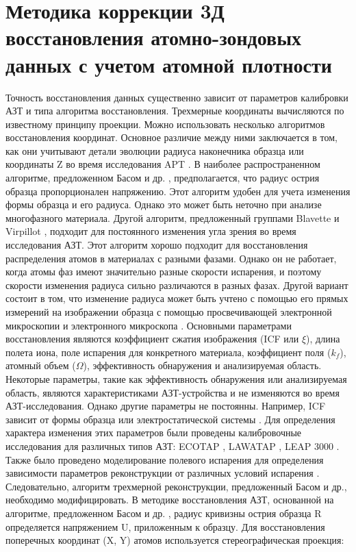 \FloatBarrier
\clearpage %
\section{Методика коррекции 3Д восстановления атомно-зондовых данных с учетом атомной плотности}\label{sec:ch3/sect5}

Точность восстановления данных существенно зависит от параметров калибровки АЗТ и типа алгоритма восстановления. Трехмерные координаты вычисляются по известному принципу проекции. Можно использовать несколько алгоритмов восстановления координат. Основное различие между ними заключается в том, как они учитывают детали эволюции радиуса наконечника образца или координаты Z во время исследования APT \cite{Vurpillot16}. В наиболее распространенном алгоритме, предложенном Басом и др. \cite{Bas95}, предполагается, что радиус острия образца пропорционален напряжению. Этот алгоритм удобен для учета изменения формы образца и его радиуса. Однако это может быть неточно при анализе многофазного материала. Другой алгоритм, предложенный группами Blavette и Virpillot \cite{Vurpillot11,Gault11}, подходит для постоянного изменения угла зрения во время исследования АЗТ. Этот алгоритм хорошо подходит для восстановления распределения атомов в материалах с разными фазами. Однако он не работает, когда атомы фаз имеют значительно разные скорости испарения, и поэтому скорости изменения радиуса сильно различаются в разных фазах. Другой вариант состоит в том, что изменение радиуса может быть учтено с помощью его прямых измерений на изображении образца с помощью просвечивающей электронной микроскопии и электронного микроскопа \cite{Larson11}. Основными параметрами восстановления являются коэффициент сжатия изображения (ICF или $\xi$), длина полета иона, поле испарения для конкретного материала, коэффициент поля ($k_f$), атомный объем ($\Omega$), эффективность обнаружения и анализируемая область. Некоторые параметры, такие как эффективность обнаружения или анализируемая область, являются характеристиками АЗТ-устройства и не изменяются во время АЗТ-исследования. Однако другие параметры не постоянны. Например, ICF зависит от формы образца или электростатической системы \cite{Geiser09,Gipson08}. Для определения характера изменения этих параметров были проведены калибровочные исследования для различных типов АЗТ: ECOTAP \cite{Geiser09}, LAWATAP \cite{Renaud03}, LEAP 3000 \cite{Renaud06}. Также было проведено моделирование полевого испарения для определения зависимости параметров реконструкции от различных условий испарения \cite{Vurpillot11,Miller14,Hatzoglou19}. Следовательно, алгоритм трехмерной реконструкции, предложенный Басом и др., необходимо модифицировать. В методике восстановления АЗТ, основанной на алгоритме, предложенном Басом и др. \cite{Bas95}, радиус кривизны острия образца R определяется напряжением U, приложенным к образцу. Для восстановления поперечных координат (X, Y) атомов используется стереографическая проекция:

